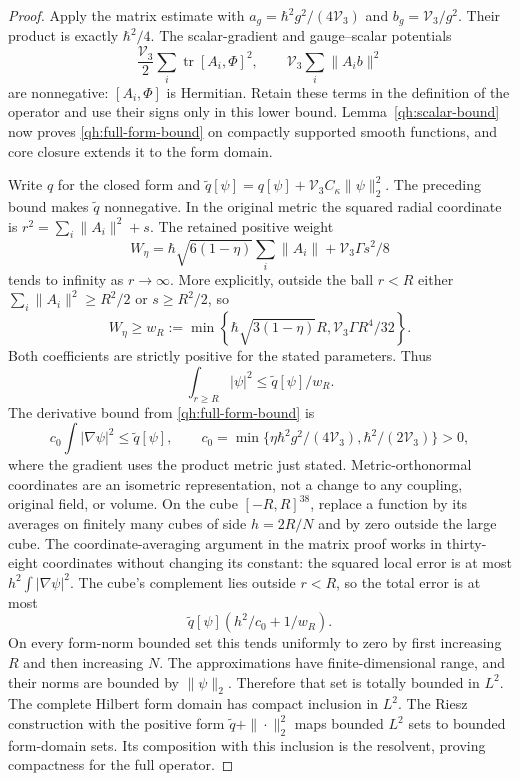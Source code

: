 \begin{proof}
Apply the matrix estimate with
$a_g=\hbar^2g^2/(4\mathcal V_3)$ and
$b_g=\mathcal V_3/g^2$. Their product is exactly $\hbar^2/4$.
The scalar-gradient and gauge--scalar potentials
\[
 \frac{\mathcal V_3}{2}\sum_i\operatorname{tr}[A_i,\Phi]^2,
 \qquad \mathcal V_3\sum_i\|A_i b\|^2
\]
are nonnegative: $[A_i,\Phi]$ is Hermitian. Retain these terms
in the definition of the operator and use their signs only in
this lower bound. Lemma~\ref{qh:scalar-bound} now proves
\eqref{qh:full-form-bound} on compactly supported smooth
functions, and core closure extends it to the form domain.

Write $q$ for the closed form and
$\widetilde q[\psi]=q[\psi]+\mathcal V_3C_\kappa\|\psi\|_2^2$.
The preceding bound makes $\widetilde q$ nonnegative.
In the original metric the squared radial coordinate is
$r^2=\sum_i\|A_i\|^2+s$.
The retained positive weight
\[
 W_\eta=\hbar\sqrt{6(1-\eta)}\sum_i\|A_i\|
                       +\mathcal V_3\Gamma s^2/8
\]
tends to infinity as $r\to\infty$. More explicitly, outside
the ball $r<R$ either $\sum_i\|A_i\|^2\geq R^2/2$ or
$s\geq R^2/2$, so
\[
 W_\eta\geq
 w_R:=\min\left\{\hbar\sqrt{3(1-\eta)}R,
                        \mathcal V_3\Gamma R^4/32\right\}.
\]
Both coefficients are strictly positive for the stated parameters.
Thus
\[
 \int_{r\geq R}|\psi|^2\leq\widetilde q[\psi]/w_R.
\]
The derivative bound from \eqref{qh:full-form-bound} is
\[
 c_0\int|\nabla\psi|^2\leq\widetilde q[\psi],\qquad
 c_0=\min\{\eta\hbar^2g^2/(4\mathcal V_3),
                          \hbar^2/(2\mathcal V_3)\}>0,
\]
where the gradient uses the product metric just stated.
Metric-orthonormal coordinates are an isometric representation,
not a change to any coupling, original field, or volume.
On the cube $[-R,R]^{38}$, replace a function by its averages on
finitely many cubes of side $h=2R/N$ and by zero outside the
large cube. The coordinate-averaging argument in the matrix proof
works in thirty-eight coordinates without changing its constant:
the squared local error is at most $h^2\int|\nabla\psi|^2$.
The cube's complement lies outside $r<R$, so the total error is at most
\[
 \widetilde q[\psi]\left(h^2/c_0+1/w_R\right).
\]
On every form-norm bounded set this tends uniformly to zero by
first increasing $R$ and then increasing $N$. The approximations
have finite-dimensional range, and their norms are bounded by
$\|\psi\|_2$. Therefore that set is totally bounded in $L^2$.
The complete Hilbert form domain has compact inclusion in $L^2$.
The Riesz construction with the positive form $\widetilde q+\|\cdot\|_2^2$ maps bounded
$L^2$ sets to bounded form-domain sets. Its composition with this
inclusion is the resolvent, proving compactness for the full operator.
\end{proof}

